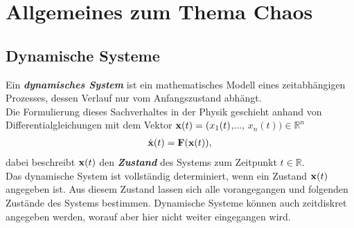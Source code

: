 

\section{Allgemeines zum Thema Chaos}
\label{sec:allgemeines}

\subsection{Dynamische Systeme}
\label{sub:dynamSys}
Ein \textit{\textbf{dynamisches System}} ist ein mathematisches Modell eines zeitabhängigen Prozesses, dessen Verlauf nur vom Anfangszustand abhängt. \citep{WikiDynSys}\\
Die Formulierung dieses Sachverhaltes in der Physik geschieht anhand von Differentialgleichungen mit dem Vektor $\vect{x}(t)=(x_1(t)$,..., $x_n(t))\in\mathbb{R}^n$
\begin{gather}
    \dot{\vect{x}}(t)=\vect{F}(\vect{x}(t)),
    \label{eq:dynamDGL}
\end{gather}
dabei beschreibt $\vect{x}(t)$ den \textit{\textbf{Zustand}} des Systems zum Zeitpunkt $t\in\mathbb{R}$.\\
Das dynamische System ist vollständig determiniert, wenn ein Zustand $\vect{x}(t)$ angegeben ist. Aus diesem Zustand lassen sich alle vorangegangen und folgenden Zustände des Systems bestimmen. Dynamische Systeme können auch zeitdiskret angegeben werden, worauf aber hier nicht weiter eingegangen wird. \citep{Lueck}\\

